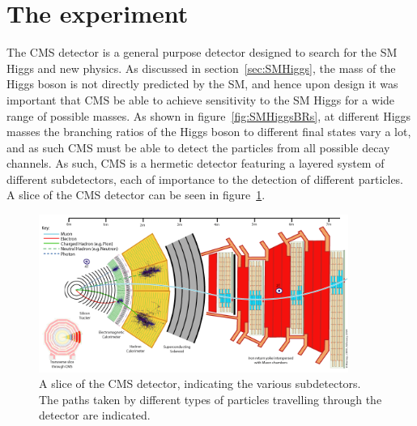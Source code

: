 \section{The \CMS experiment}
\label{sec:CMSInDetail}

The CMS detector is a general purpose detector designed to search for the
\ac{SM} Higgs and new physics. As discussed in section~\ref{sec:SMHiggs}, the
mass of the Higgs boson is not directly predicted by the \ac{SM}, and hence upon
design it was important that CMS be able to achieve sensitivity to the \ac{SM} Higgs for a
wide range of possible masses. As shown in figure~\ref{fig:SMHiggsBRs}, at different
Higgs masses the branching ratios of the Higgs boson to different final states
vary a lot, and as such CMS must be able to detect the particles from all
possible decay channels. As such, CMS is a hermetic detector featuring
a layered system of different subdetectors, each of importance to the detection
of different particles. A slice of the CMS detector can be seen in
figure~\ref{fig:CMSslice}.

\begin{figure}[htbp]
   \includegraphics[width=0.9\textwidth]{plots/detector/CMS_Slice.png}
\caption[A slice of the CMS detector, indicating the various subdetectors.]
{A slice of the CMS detector, indicating the various subdetectors. The
paths taken by different types of particles travelling through the detector are
indicated.}
\label{fig:CMSslice}
\end{figure}

